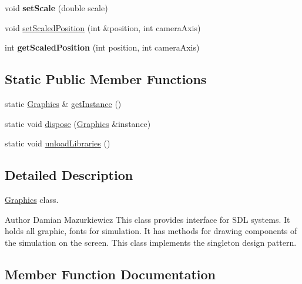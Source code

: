 \begin{DoxyCompactItemize}
\item 
\hypertarget{class_graphics_ae104601ac5893ff7374717f8524f17a4}{}void {\bfseries set\+Scale} (double scale)\label{class_graphics_ae104601ac5893ff7374717f8524f17a4}

\item 
void \hyperlink{class_graphics_a29b40ec841099a9a2e39bda3defdaec5}{set\+Scaled\+Position} (int \&position, int camera\+Axis)
\item 
\hypertarget{class_graphics_ac26fea83c8db7df7056289fc06b7c208}{}int {\bfseries get\+Scaled\+Position} (int position, int camera\+Axis)\label{class_graphics_ac26fea83c8db7df7056289fc06b7c208}

\end{DoxyCompactItemize}
\subsection*{Static Public Member Functions}
\begin{DoxyCompactItemize}
\item 
static \hyperlink{class_graphics}{Graphics} \& \hyperlink{class_graphics_ac0bc6e7ec08bf0e9c500c268af07a07d}{get\+Instance} ()
\item 
static void \hyperlink{class_graphics_a7e18799dd39f2d61ce8caae62bf931c5}{dispose} (\hyperlink{class_graphics}{Graphics} \&instance)
\item 
static void \hyperlink{class_graphics_afa61586a2fddbe60524a39d178467137}{unload\+Libraries} ()
\end{DoxyCompactItemize}


\subsection{Detailed Description}
\hyperlink{class_graphics}{Graphics} class. \begin{DoxyAuthor}{Author}
Damian Mazurkiewicz This class provides interface for S\+D\+L systems. It holds all graphic, fonts for simulation. It has methods for drawing components of the simulation on the screen. This class implements the singleton design pattern. 
\end{DoxyAuthor}


\subsection{Member Function Documentation}
\hypertarget{class_graphics_a68beb512b0697952ebafce249c86dbd3}{}
